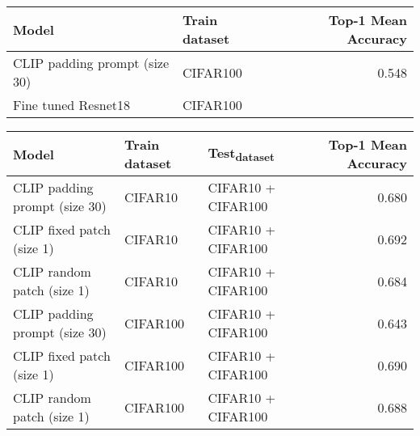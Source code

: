 \documentclass[11pt]{article}
\begin{document}
\begin{center}
\begin{tabular}{llr}
Model & Train dataset & Top-1 Mean Accuracy\\
\hline
CLIP padding prompt (size 30) & CIFAR100 & 0.548\\
Fine tuned Resnet18 & CIFAR100 & \\
\end{tabular}
\end{center}



\begin{center}
\begin{tabular}{lllr}
Model & Train dataset & Test\textsubscript{dataset} & Top-1 Mean Accuracy\\
\hline
CLIP padding prompt (size 30) & CIFAR10 & CIFAR10 + CIFAR100 & 0.680\\
CLIP fixed patch (size 1) & CIFAR10 & CIFAR10 + CIFAR100 & 0.692\\
CLIP random patch (size 1) & CIFAR10 & CIFAR10 + CIFAR100 & 0.684\\
CLIP padding prompt (size 30) & CIFAR100 & CIFAR10 + CIFAR100 & 0.643\\
CLIP fixed patch (size 1) & CIFAR100 & CIFAR10 + CIFAR100 & 0.690\\
CLIP random patch (size 1) & CIFAR100 & CIFAR10 + CIFAR100 & 0.688\\
\end{tabular}
\end{center}
\end{document}

